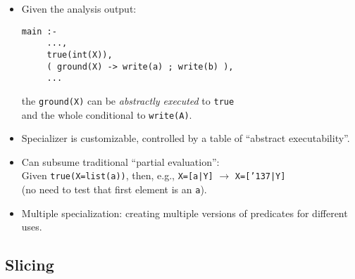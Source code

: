 \documentclass{article}
\renewcommand{\_}{\char'137}
\begin{document}
\begin{itemize}
\item Given the analysis output:
\begin{verbatim}
main :-
     ...,
     true(int(X)),
     ( ground(X) -> write(a) ; write(b) ),
     ...
\end{verbatim}
the \texttt{ground(X)} can be \emph{abstractly executed}
\nocite{abs-exec-lopstr} to \texttt{true}\\
and the whole conditional to \texttt{write(A)}.

\item Specializer is customizable, controlled by a table of ``abstract
  executability''. 

\item Can subsume traditional ``partial evaluation'':\\
      Given \texttt{true(X=list(a))}, then, e.g., \texttt{X=[a|Y]}
      $\rightarrow$ 
      \texttt{X=[\_|Y]}\\
      (no need to test that first element is an \texttt{a}).

\item Multiple specialization: creating multiple versions of
  predicates for different uses.
\end{itemize}



\subsection{Slicing}
\end{document}
